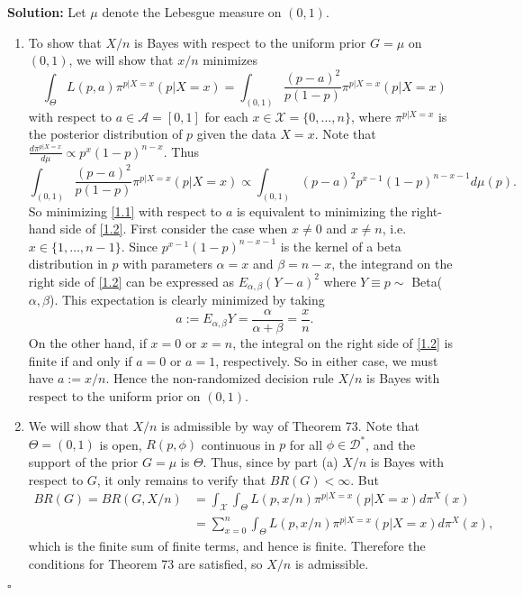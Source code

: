 \documentclass[12pt]{article}
\newcounter{ProofCounter}
\newenvironment{Solution}{\stepcounter{ProofCounter}\textbf{Solution:}}{\hfill$\square$}
\begin{document}
\begin{Solution}
  Let $\mu$ denote the Lebesgue measure on $(0,1)$.
  \begin{enumerate}[label=(\alph*), leftmargin=6mm]
    \item To show that $X / n$ is Bayes with respect to the uniform prior $G = \mu$ on $(0,1)$, we will show that $x / n$ minimizes
      \begin{equation}
        \int_{\Theta}L(p,a) \pi^{p|X=x}(p|X=x) = \int_{(0,1)} \frac{(p-a)^2}{p(1-p)}\pi^{p|X=x}(p|X=x)
        \label{1.1}
      \end{equation}
      with respect to $a \in \mathcal{A} = [0,1]$ for each $x \in \mathcal{X} = \{0, \dots, n\}$, where $\pi^{p|X=x}$ is the posterior distribution of
      $p$ given the data $X = x$. Note that $\frac{d\pi^{p|X=x}}{d\mu} \propto p^{x}(1-p)^{n-x}$. Thus
      \begin{equation}
        \int_{(0,1)} \frac{(p-a)^2}{p(1-p)}\pi^{p|X=x}(p|X=x) \propto \int_{(0,1)}(p-a)^2 p^{x-1}(1-p)^{n-x-1}d\mu(p).
        \label{1.2}
      \end{equation}
      So minimizing \eqref{1.1} with respect to $a$ is equivalent to minimizing the right-hand side of \eqref{1.2}.
      First consider the case when $x \neq 0$ and $x\neq n$, i.e. $x \in \{1, \dots, n-1\}$. Since $p^{x-1}(1-p)^{n-x-1}$ is the kernel of a beta
      distribution in $p$ with parameters $\alpha = x$ and $\beta = n-x$, the integrand on the right side of \eqref{1.2} can be expressed as 
      $E_{\alpha,\beta}(Y-a)^2$
      where $Y \equiv p \sim$ Beta($\alpha, \beta$). This expectation is clearly minimized by taking 
      \[
        a := E_{\alpha,\beta}Y = \frac{\alpha}{\alpha + \beta} = \frac{x}{n}.
      \]
      On the other hand, if $x = 0$ or $x = n$, the integral on the right side of \eqref{1.2} is finite if and only if $a = 0$ or $a = 1$,
      respectively. So in either case, we must have $a := x / n$. Hence the non-randomized decision rule $X / n$ is Bayes with respect to the uniform
      prior on $(0,1)$.

    \item We will show that $X / n$ is admissible by way of Theorem 73. Note that $\Theta = (0,1)$ is open, $R(p, \phi)$ continuous in $p$ for all $\phi
      \in \mathcal{D}^*$, and the support of the prior $G = \mu$ is $\Theta$. Thus, since by part (a) $X / n$ is Bayes with respect to 
      $G$, it only remains to verify that $BR(G) < \infty$. But
      \begin{align*} 
        BR(G) = BR(G, X/n) & = \int_{\mathcal{X}} \int_{\Theta}L(p,x/n)\pi^{p|X=x}(p|X=x)d\pi^X(x) \\
        & = \sum_{x=0}^n\int_{\Theta}L(p,x/n)\pi^{p|X=x}(p|X=x)d\pi^X(x),
      \end{align*}
      which is the finite sum of finite terms, and hence is finite. Therefore the conditions for Theorem 73 are satisfied, so $X / n$ is admissible.


\end{enumerate}
\end{Solution}
\end{document}
